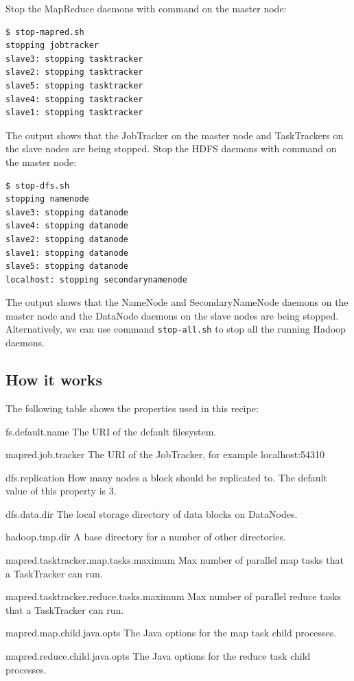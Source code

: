 Stop the MapReduce daemons with command on the master node:
\lstset{style=bashstyle}
\begin{lstlisting}
$ stop-mapred.sh
stopping jobtracker
slave3: stopping tasktracker
slave2: stopping tasktracker
slave5: stopping tasktracker
slave4: stopping tasktracker
slave1: stopping tasktracker
\end{lstlisting}

The output shows that the JobTracker on the master node and TaskTrackers on the slave nodes are being stopped.
Stop the HDFS daemons with command on the master node:
\lstset{style=bashstyle}
\begin{lstlisting}
$ stop-dfs.sh
stopping namenode
slave3: stopping datanode
slave4: stopping datanode
slave2: stopping datanode
slave1: stopping datanode
slave5: stopping datanode
localhost: stopping secondarynamenode
\end{lstlisting}

The output shows that the NameNode and SecondaryNameNode daemons on the master node and the DataNode daemons on the slave nodes are being stopped. Alternatively, we can use command \verb|stop-all.sh| to stop all the running Hadoop daemons.

\subsection*{How it works}
The following table shows the properties used in this recipe:
\begin{description}
    \item{fs.default.name} The URI of the default filesystem.
    \item{mapred.job.tracker} The URI of the JobTracker, for example localhost:54310
    \item{dfs.replication} How many nodes a block should be replicated to. The default value of this property is 3.
    \item{dfs.data.dir} The local storage directory of data blocks on DataNodes.
    \item{hadoop.tmp.dir} A base directory for a number of other directories.
    \item{mapred.tasktracker.map.tasks.maximum} Max number of parallel map tasks that a TaskTracker can run.
    \item{mapred.tasktracker.reduce.tasks.maximum} Max number of parallel reduce tasks that a TaskTracker can run.
    \item{mapred.map.child.java.opts} The Java options for the map task child processes.
    \item{mapred.reduce.child.java.opts} The Java options for the reduce task child processes.
\end{description}

